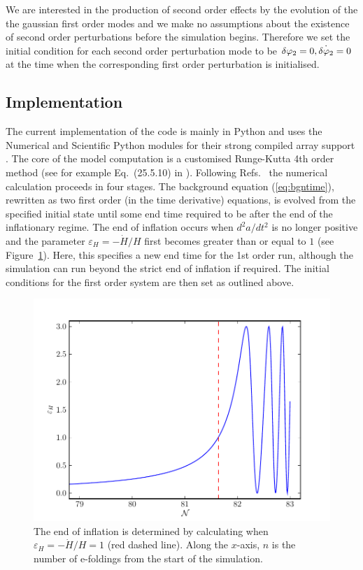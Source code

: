 We are interested in the production of second order effects by the
evolution of the the gaussian first order modes and we make no
assumptions about the existence of second order perturbations before
the simulation begins. Therefore we set the initial condition for each second order
perturbation mode to be $\delta\varphi_{2}=0, \dot{\delta\varphi_{2}}=0$ at
the time when the corresponding first order perturbation is initialised.



\subsection{Implementation} 
\label{sec:implementation}


The current implementation of the code is mainly in Python and uses the
Numerical and Scientific Python modules for their strong compiled array support
\cite{scipy}. The core of the model computation is a customised
Runge-Kutta 4th order method (see for example Eq.~(25.5.10) in
\cite{abramowitz+stegun}).  Following
Refs.~\cite{Martin:2006rs,Ringeval:2007am} the numerical calculation
proceeds in four stages. The background equation (\ref{eq:bgntime}),
rewritten as two first order (in the time derivative) equations, is
evolved from the specified initial state until some end time required
to be after the end of the inflationary regime.  The end of inflation
occurs when $d^2a/dt^2$ is no longer positive and the parameter
$\varepsilon_H = -\dot{H}/H$ first becomes greater than or equal to $1$
(see Figure~\ref{fig:eps}). Here, this specifies a new end time for the 1st
order run, although the simulation can run beyond the strict end of
inflation if required. The initial conditions for the first order
system are then set as outlined above.
%
\begin{figure}
\centering
 \includegraphics[scale=0.8]{./numerical/graphs/bgepsilon}
 \caption{The end of inflation is determined by calculating when
   $\varepsilon_H=-\dot{H}/H=1$ (red dashed line). Along the $x$-axis,
   $n$ is the number of e-foldings from the start of the
   simulation.}
\label{fig:eps}
\end{figure}

